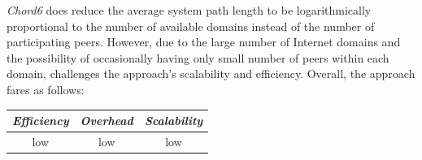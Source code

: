 \emph{Chord6} does reduce the average system path length to be
logarithmically proportional to the number of available domains 
instead of the number of participating peers. 
However, due to the large number of Internet
domains and the possibility of occasionally having only 
small number of peers within each domain,
\cite{DK2006} challenges the approach's scalability and efficiency.
Overall, the approach fares as follows:
\begin{center}
{\footnotesize
\begin{tabular}{ccc}
\emph{Efficiency} & \emph{Overhead} & \emph{Scalability} \\
\hline
low &
low &
low
\end{tabular}
}
\end{center}


